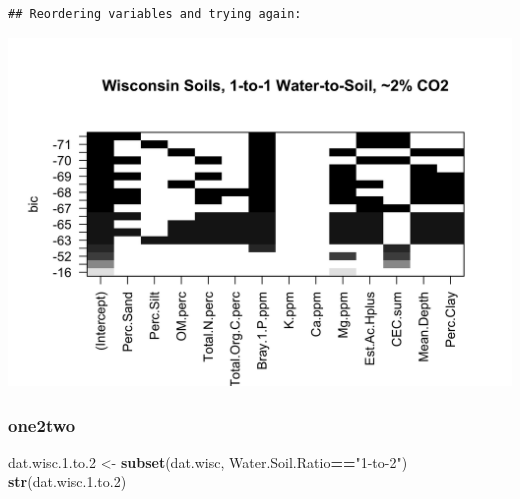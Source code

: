 \documentclass[]{article}
\newenvironment{Shaded}{\begin{snugshade}}{\end{snugshade}}
\newcommand{\DataTypeTok}[1]{\textcolor[rgb]{0.13,0.29,0.53}{#1}}
\newcommand{\FloatTok}[1]{\textcolor[rgb]{0.00,0.00,0.81}{#1}}
\newcommand{\KeywordTok}[1]{\textcolor[rgb]{0.13,0.29,0.53}{\textbf{#1}}}
\newcommand{\NormalTok}[1]{#1}
\newcommand{\OperatorTok}[1]{\textcolor[rgb]{0.81,0.36,0.00}{\textbf{#1}}}
\newcommand{\StringTok}[1]{\textcolor[rgb]{0.31,0.60,0.02}{#1}}
\begin{document}
\begin{verbatim}
## Reordering variables and trying again:
\end{verbatim}

\begin{Shaded}
\end{Shaded}

\includegraphics{output-rmd/bic.wisc.one2one.highco2-1.png}

\hypertarget{one2two}{%
\subsubsection{one2two}\label{one2two}}

\begin{Shaded}
\begin{Highlighting}[]
\NormalTok{dat.wisc.}\FloatTok{1.}\NormalTok{to}\FloatTok{.2}\NormalTok{ <-}\StringTok{ }\KeywordTok{subset}\NormalTok{(dat.wisc, Water.Soil.Ratio}\OperatorTok{==}\StringTok{"1-to-2"}\NormalTok{)}
\KeywordTok{str}\NormalTok{(dat.wisc.}\FloatTok{1.}\NormalTok{to}\FloatTok{.2}\NormalTok{)}
\end{Highlighting}
\end{Shaded}
\end{document}
